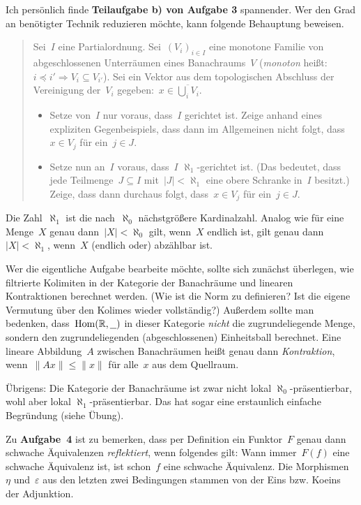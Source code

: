 \documentclass{uebblatt}
\begin{document}
Ich persönlich finde \textbf{Teilaufgabe b) von Aufgabe 3} spannender.
Wer den Grad an benötigter Technik reduzieren möchte, kann folgende Behauptung
beweisen.
\begin{quote}
Sei~$I$ eine Partialordnung.
Sei~$(V_i)_{i \in I}$ eine monotone Familie von abgeschlossenen Unterräumen
eines Banachraums~$V$ (\emph{monoton} heißt: $i \preceq i' \Rightarrow
V_i \subseteq V_{i'}$).
Sei ein Vektor aus dem topologischen Abschluss der Vereinigung der~$V_i$
gegeben:~$x \in \overline{\bigcup_i V_i}$.
\begin{itemize}
\item Setze von~$I$ nur voraus, dass~$I$ gerichtet ist.
Zeige anhand eines expliziten Gegenbeispiels, dass dann im Allgemeinen nicht
folgt, dass~$x \in V_j$ für ein~$j \in J$.
\item Setze nun an~$I$ voraus, dass~$I$ $\aleph_1$-gerichtet ist. (Das
bedeutet, dass jede Teilmenge~$J \subseteq I$ mit~$|J| < \aleph_1$ eine obere
Schranke in~$I$ besitzt.) Zeige, dass dann durchaus folgt, dass~$x \in V_j$ für
ein~$j \in J$.
\end{itemize}
\end{quote}
Die Zahl~$\aleph_1$ ist die nach~$\aleph_0$ nächstgrößere Kardinalzahl. Analog
wie für eine Menge~$X$ genau dann~$|X| < \aleph_0$ gilt, wenn~$X$ endlich ist,
gilt genau dann~$|X| < \aleph_1$, wenn~$X$ (endlich oder) abzählbar ist.

Wer die eigentliche Aufgabe bearbeite möchte, sollte sich zunächst überlegen,
wie filtrierte Kolimiten in der Kategorie der Banachräume und linearen
Kontraktionen berechnet werden. (Wie ist die Norm zu definieren? Ist die eigene
Vermutung über den Kolimes wieder vollständig?) Außerdem sollte man bedenken,
dass~$\mathrm{Hom}(\mathbb{R},\underline{\ \ })$ in dieser Kategorie \emph{nicht} die
zugrundeliegende Menge, sondern den zugrundeliegenden (abgeschlossenen)
Einheitsball berechnet. Eine lineare Abbildung~$A$ zwischen
Banachräumen heißt genau dann \emph{Kontraktion}, wenn~$\|Ax\| \leq \|x\|$ für
alle~$x$ aus dem Quellraum.

Übrigens: Die Kategorie der Banachräume ist zwar nicht lokal
$\aleph_0$-präsentierbar, wohl aber lokal $\aleph_1$-präsentierbar. Das hat
sogar eine erstaunlich einfache Begründung (siehe Übung).

Zu \textbf{Aufgabe~4} ist zu bemerken, dass per Definition ein Funktor~$F$
genau dann schwache Äquivalenzen \emph{reflektiert}, wenn folgendes gilt: Wann
immer~$F(f)$ eine schwache Äquivalenz ist, ist schon~$f$ eine schwache
Äquivalenz. Die Morphismen~$\eta$ und~$\varepsilon$ aus den letzten zwei
Bedingungen stammen von der Eins bzw. Koeins der Adjunktion.
\end{document}
